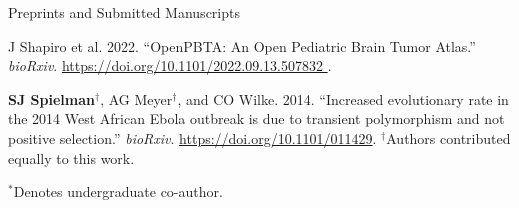 \documentclass{resume} %
\begin{document}
\vspace*{0.35cm}
\begin{rSection}{Preprints and Submitted Manuscripts}
\vspace*{0.25cm}

\begin{etaremune}[leftmargin=1.5em]

\item J Shapiro et al. 2022. ``OpenPBTA: An Open Pediatric Brain Tumor Atlas.'' \emph{bioRxiv}. \url{https://doi.org/10.1101/2022.09.13.507832 }.


\item \textbf{SJ Spielman}$^\dagger$, AG Meyer$^\dagger$, and CO Wilke. 2014. ``Increased evolutionary rate in the 2014 West African Ebola outbreak is due to transient polymorphism and not positive selection.'' \emph{bioRxiv}. \url{https://doi.org/10.1101/011429}. $^\dagger$Authors contributed equally to this work.

\end{etaremune}


$^\ast$Denotes undergraduate co-author.

\end{rSection}



\end{document}
